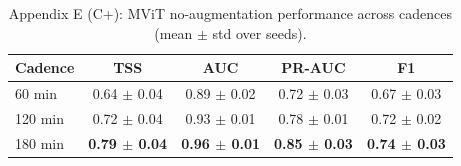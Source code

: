 \begin{table}[p]
\centering
\scriptsize
\caption{Appendix E (C+): MViT no-augmentation performance across cadences (mean $\pm$ std over seeds).}
\label{tab:appE_cplus_reordered}
\begin{tabular}{lcccc}
\toprule
Cadence & TSS & AUC & PR-AUC & F1 \\
\midrule
60 min & 0.64 $\pm$ 0.04 & 0.89 $\pm$ 0.02 & 0.72 $\pm$ 0.03 & 0.67 $\pm$ 0.03 \\
120 min & 0.72 $\pm$ 0.04 & 0.93 $\pm$ 0.01 & 0.78 $\pm$ 0.01 & 0.72 $\pm$ 0.02 \\
180 min & \textbf{0.79 $\pm$ 0.04} & \textbf{0.96 $\pm$ 0.01} & \textbf{0.85 $\pm$ 0.03} & \textbf{0.74 $\pm$ 0.03} \\
\bottomrule
\end{tabular}
\end{table}
